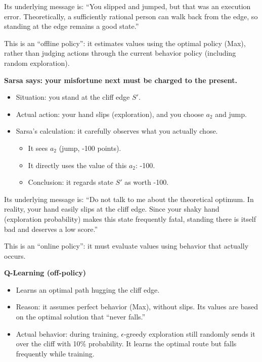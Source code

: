 Its underlying message is: ``You slipped and jumped, but that was an execution error. Theoretically, a sufficiently rational person can walk back from the edge, so standing at the edge remains a good state.''

This is an ``offline policy'': it estimates values using the optimal policy (Max), rather than judging actions through the current behavior policy (including random exploration).

\textbf{Sarsa says: your misfortune next must be charged to the present.}

\begin{itemize}
\tightlist
\item
  Situation: you stand at the cliff edge \(S'\).
\item
  Actual action: your hand slips (exploration), and you choose \(a_2\) and jump.
\item
  Sarsa's calculation: it carefully observes what you actually chose.

  \begin{itemize}
  \tightlist
  \item
    It sees \(a_2\) (jump, -100 points).
  \item
    It directly uses the value of this \(a_2\): -100.
  \item
    Conclusion: it regards state \(S'\) as worth -100.
  \end{itemize}
\end{itemize}

Its underlying message is: ``Do not talk to me about the theoretical optimum. In reality, your hand easily slips at the cliff edge. Since your shaky hand (exploration probability) makes this state frequently fatal, standing there is itself bad and deserves a low score.''

This is an ``online policy'': it must evaluate values using behavior that actually occurs.

\textbf{Q-Learning (off-policy)}

\begin{itemize}
\tightlist
\item
  Learns an optimal path hugging the cliff edge.
\item
  Reason: it assumes perfect behavior (Max), without slips. Its values are based on the optimal solution that ``never falls.''
\item
  Actual behavior: during training, \(\epsilon\)-greedy exploration still randomly sends it over the cliff with 10\% probability. It learns the optimal route but falls frequently while training.
\end{itemize}

